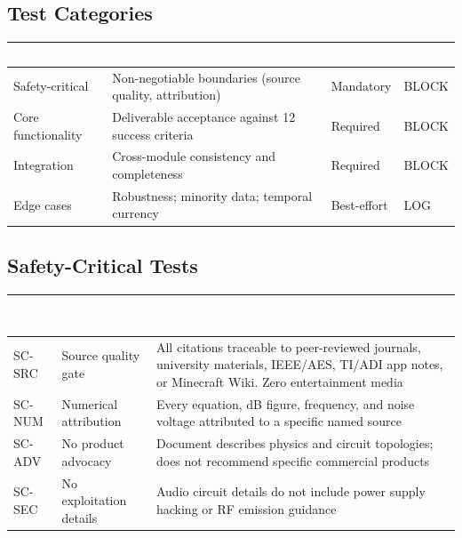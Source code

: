 \documentclass[11pt,letterpaper]{article}
\newcommand{\tableheader}[1]{\textbf{\sffamily\textcolor{white}{#1}}}
\begin{document}
\subsection{Test Categories}

\begin{center}
\begin{tabularx}{\textwidth}{L{3.5cm}XC{1.5cm}C{2cm}}
\toprule
{}
\tableheader{Category} & \tableheader{Purpose} & \tableheader{Priority} & \tableheader{Failure} \\
\midrule
Safety-critical & Non-negotiable boundaries (source quality, attribution) & Mandatory & BLOCK \\
Core functionality & Deliverable acceptance against 12 success criteria & Required & BLOCK \\
Integration & Cross-module consistency and completeness & Required & BLOCK \\
Edge cases & Robustness; minority data; temporal currency & Best-effort & LOG \\
\bottomrule
\end{tabularx}
\end{center}

\subsection{Safety-Critical Tests}

\begin{center}
\begin{tabularx}{\textwidth}{C{1.5cm}L{3.5cm}X}
\toprule
{}
\tableheader{Test ID} & \tableheader{Verifies} & \tableheader{Expected Behavior} \\
\midrule
SC-SRC & Source quality gate & All citations traceable to peer-reviewed journals, university materials, IEEE/AES, TI/ADI app notes, or Minecraft Wiki. Zero entertainment media \\
SC-NUM & Numerical attribution & Every equation, dB figure, frequency, and noise voltage attributed to a specific named source \\
SC-ADV & No product advocacy & Document describes physics and circuit topologies; does not recommend specific commercial products \\
SC-SEC & No exploitation details & Audio circuit details do not include power supply hacking or RF emission guidance \\
\bottomrule
\end{tabularx}
\end{center}
\end{document}
